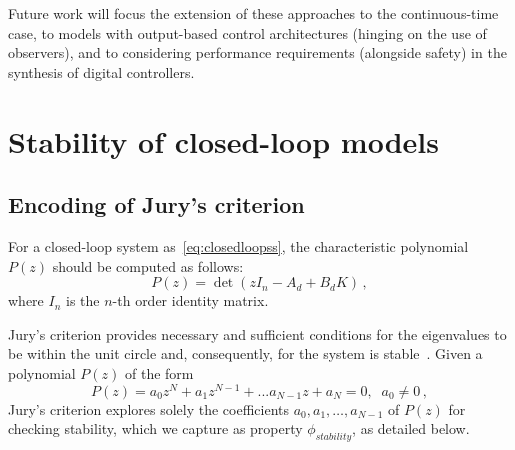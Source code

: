 \documentclass[runningheads,a4paper]{llncs}
\newcommand{\addtodo}[1]{{\color{red} TODO: #1}}
\begin{document}
Future work will focus the extension of these approaches to the
continuous-time case, to models with output-based control architectures
(hinging on the use of observers), and to considering performance
requirements (alongside safety) in the synthesis of digital controllers.

\newpage


  

\newpage
\appendix


\section{Stability of closed-loop models}
\label{sec:appendix-stability}


\subsection{Encoding of Jury's criterion}

For a closed-loop system as~\eqref{eq:closedloopss}, 
the characteristic polynomial $P(z)$ should be computed as follows:
%
\begin{equation}
P(z)= \det( z I_{n} - A_d + B_d K ) \,,
\end{equation}
%
where $I_{n}$ is the $n$-th order identity matrix. 

Jury's criterion provides necessary and sufficient conditions for the
eigenvalues to be within the unit circle and, consequently, for the system
is stable~\cite{fadali}.  Given a polynomial $P(z)$ of the form
%
$$
P(z) = a_{0}z^{N} + a_{1}z^{N-1} + ... a_{N-1}z + a_{N} = 0, \;\; a_{0}\neq 0 \,,
$$
%
Jury's criterion explores solely the coefficients
$a_{0},a_{1},\ldots,a_{N-1}$ of $P(z)$ for checking stability, which we
capture as property $\phi_\mathit{stability}$, as detailed below.
\end{document}
